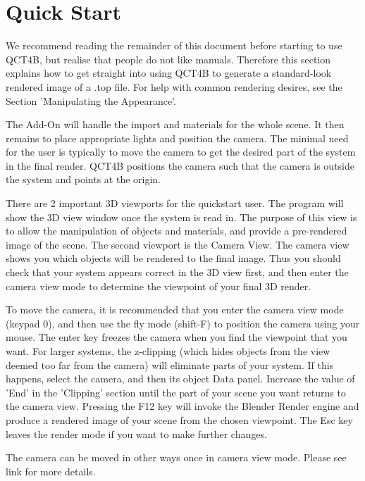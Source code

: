 \documentclass{report}
\begin{document}
\section{Quick Start}

We recommend reading the remainder of this document before starting to use QCT4B, but realise that people do not like manuals.
Therefore this section explains how to get straight into using QCT4B to generate a standard-look rendered image of a .top file.
For help with common rendering desires, see the Section 'Manipulating the Appearance'.

The Add-On will handle the import and materials for the whole scene.
It then remains to place appropriate lights and position the camera.
The minimal need for the user is typically to move the camera to get the desired part of the system in the final render.
QCT4B positions the camera such that the camera is outside the system and points at the origin.

There are 2 important 3D viewports for the quickstart user. The program will show the 3D view window once the system is read in.
The purpose of this view is to allow the manipulation of objects and materials, and provide a pre-rendered image of the scene.
The second viewport is the Camera View. The camera view shows you which objects will be rendered to the final image.
Thus you should check that your system appears correct in the 3D view first, and then enter the camera view mode to determine the viewpoint of your final 3D render.

To move the camera, it is recommended that you enter the camera view mode (keypad 0), and then use the fly mode (shift-F) to position the camera using your mouse.
The enter key freezes the camera when you find the viewpoint that you want.
For larger systems, the z-clipping (which hides objects from the view deemed too far from the camera) will eliminate parts of your system.
If this happens, select the camera, and then its object Data panel.
Increase the value of 'End' in the 'Clipping' section until the part of your scene you want returns to the camera view.
Pressing the F12 key will invoke the Blender Render engine and produce a rendered image of your scene from the chosen viewpoint.
The Esc key leaves the render mode if you want to make further changes.


The camera can be moved in other ways once in camera view mode. Please see link for more details.

\end{document}
